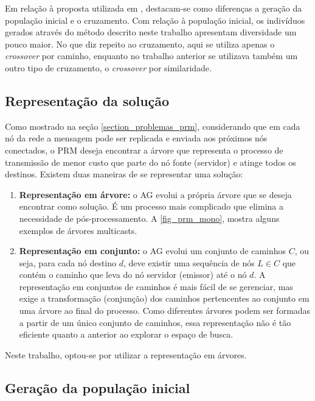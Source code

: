 Em relação à proposta utilizada em \cite{LafetaThesis}, destacam-se como diferenças a geração da população inicial e o cruzamento. Com relação à população inicial, os indivíduos gerados através do método descrito neste trabalho apresentam diversidade um pouco maior. No que diz repeito ao cruzamento, aqui se utiliza apenas o \textit{crossover} por caminho, enquanto no trabalho anterior se utilizava também um outro tipo de cruzamento, o \textit{crossover} por similaridade.

\subsection{Representação da solução}

Como mostrado na seção \ref{section_problemas_prm}, considerando que em cada nó da rede a mensagem pode ser replicada e enviada aos próximos nós conectados, o PRM deseja encontrar a árvore que representa o processo de transmissão de menor custo que parte do nó fonte (servidor) e atinge todos os destinos. Existem duas maneiras de se representar uma solução:

\begin{enumerate}
	\item \textbf{Representação em árvore:} \cite{Bueno2010} o AG evolui a própria árvore que se deseja encontrar como solução. É um processo mais complicado que elimina a necessidade de pós-processamento. A \autoref{fig_prm_mono}, mostra alguns exemplos de árvores multicasts.
	\item \textbf{Representação em conjunto:} \cite{Baran2004} o AG evolui um conjunto de caminhos $C$, ou seja, para cada nó destino $d$, deve existir uma sequência de nós $L \in C$ que contém o caminho que leva do nó servidor (emissor) até o nó $d$. A representação em conjuntos de caminhos é mais fácil de se gerenciar, mas exige a transformação (conjunção) dos caminhos pertencentes ao conjunto em uma árvore  ao final do processo. Como diferentes árvores podem ser formadas a partir de um único conjunto de caminhos, essa representação não é tão eficiente quanto a anterior ao explorar o espaço de busca.
\end{enumerate}

Neste trabalho, optou-se por utilizar a representação em árvores.

\subsection{Geração da população inicial}

